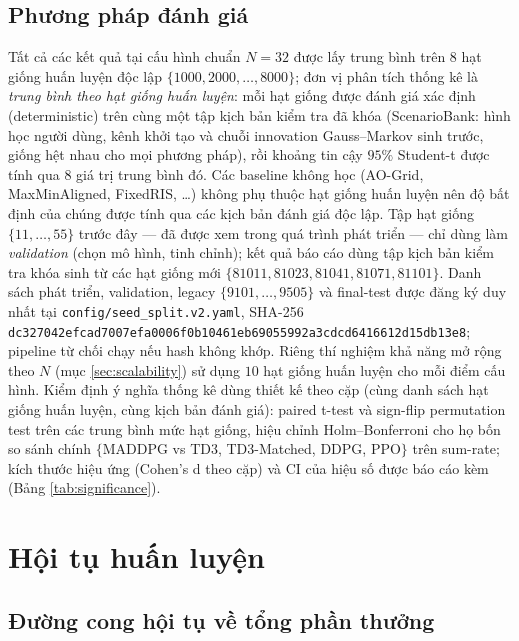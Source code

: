 \subsection{Phương pháp đánh giá}

Tất cả các kết quả tại cấu hình chuẩn $N=32$ được lấy trung bình trên
$8$ hạt giống huấn luyện độc lập $\{1000, 2000, \ldots, 8000\}$; đơn vị
phân tích thống kê là \emph{trung bình theo hạt giống huấn luyện}: mỗi
hạt giống được đánh giá xác định (deterministic) trên cùng một tập kịch
bản kiểm tra đã khóa (ScenarioBank: hình học người dùng, kênh khởi tạo
và chuỗi innovation Gauss--Markov sinh trước, giống hệt nhau cho mọi
phương pháp), rồi khoảng tin cậy $95\%$ Student-t được tính qua $8$ giá
trị trung bình đó. Các baseline không học (AO-Grid, MaxMinAligned,
FixedRIS, \ldots) không phụ thuộc hạt giống huấn luyện nên độ bất định
của chúng được tính qua các kịch bản đánh giá độc lập. Tập hạt giống
$\{11, \ldots, 55\}$ trước đây --- đã được xem trong quá trình phát
triển --- chỉ dùng làm \emph{validation} (chọn mô hình, tinh chỉnh);
kết quả báo cáo dùng tập kịch bản kiểm tra khóa sinh từ các hạt giống
mới $\{81011, 81023, 81041, 81071, 81101\}$. Danh sách phát triển, validation,
legacy $\{9101,\ldots,9505\}$ và final-test được đăng ký duy nhất tại
\texttt{config/seed\_split.v2.yaml}, SHA-256
\texttt{dc327042efcad7007efa0006f0b10461eb69055992a3cdcd6416612d15db13e8};
pipeline từ chối chạy nếu hash không khớp. Riêng thí nghiệm khả năng mở rộng theo
$N$ (mục \ref{sec:scalability}) sử dụng $10$ hạt giống huấn luyện cho
mỗi điểm cấu hình. Kiểm định ý nghĩa thống kê dùng thiết kế theo cặp
(cùng danh sách hạt giống huấn luyện, cùng kịch bản đánh giá): paired
t-test và sign-flip permutation test trên các trung bình mức hạt
giống, hiệu chỉnh Holm--Bonferroni cho họ bốn so sánh chính
$\{$MADDPG vs TD3, TD3-Matched, DDPG, PPO$\}$ trên sum-rate; kích thước hiệu ứng
(Cohen's d theo cặp) và CI của hiệu số được báo cáo kèm (Bảng
\ref{tab:significance}).

\section{Hội tụ huấn luyện}
\label{sec:convergence}

\subsection{Đường cong hội tụ về tổng phần thưởng}

